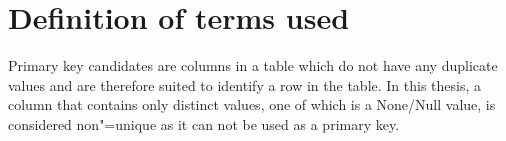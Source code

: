 \section{Definition of terms used}\label{sec:definition_terms}
Primary key candidates are columns in a table which do not have any duplicate values and are therefore suited to identify a row in the table. In this thesis, a column that contains only distinct values, one of which is a None/Null value, is considered non"=unique as it can not be used as a primary key.  %

